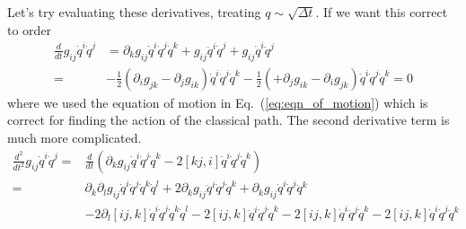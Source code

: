 Let's try evaluating these derivatives, treating $ q\sim \sqrt{\Delta t}$.  If we want this correct to order 
\begin{align}
\frac{d}{dt}g_{ij}\dot{q}^i\dot{q}^j &= \partial_kg_{ij}\dot{q}^i\dot{q}^j\dot{q}^k  + g_{ij}\ddot{q}^i\dot{q}^j +g_{ij}\dot{q}^i\ddot{q}^j\\
=&   - \frac{1}{2}(\partial_ig_{jk} - \partial_jg_{ik})\dot{q}^i\dot{q}^j\dot{q}^k  - \frac{1}{2}(+\partial_jg_{ik} - \partial_ig_{jk})\dot{q}^i\dot{q}^j\dot{q}^k  = 0
\end{align}
where we used the equation of motion in Eq.~(\ref{eq:eqn_of_motion})  which is correct for finding the action of the classical path.  The second derivative term is much more complicated.  
\begin{align}
\frac{d^2}{dt^2}g_{ij}\dot{q}^i\dot{q}^j  =& \frac{d}{dt}\left(\partial_kg_{ij}\dot{q}^i\dot{q}^j\dot{q}^k  - 2[kj,i]\dot{q}^i\dot{q}^j\dot{q}^k\right)\\
=& \partial_k\partial_lg_{ij}\dot{q}^i\dot{q}^j\dot{q}^k\dot{q}^l + 2\partial_kg_{ij}\ddot{q}^i\dot{q}^j\dot{q}^k + \partial_kg_{ij}\dot{q}^i\dot{q}^j\ddot{q}^k\\
&-2\partial_l[ij,k]\dot{q}^i\dot{q}^j\dot{q}^k\dot{q}^l - 2[ij,k]\ddot{q}^i\dot{q}^j\dot{q}^k- 2[ij,k]\dot{q}^i\ddot{q}^j\dot{q}^k- 2[ij,k]\dot{q}^i\dot{q}^j\ddot{q}^k
\end{align}

